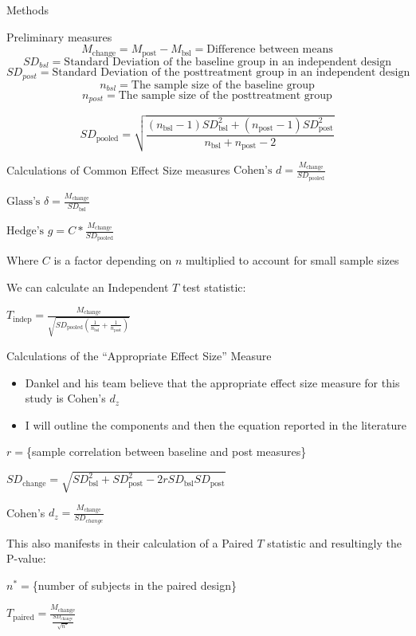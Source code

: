 \documentclass[
  ignorenonframetext,
  aspectratio=169,
]{beamer}
\providecommand{\tightlist}{%
  \setlength{\itemsep}{0pt}\setlength{\parskip}{0pt}}
\begin{document}
\begin{frame}{Methods}
\protect\hypertarget{methods}{}
\begin{block}{Preliminary measures}
\protect\hypertarget{preliminary-measures}{}
\[
M_{\text{change}}=M_{\text{post}}-M_{\text{bsl}}=\text{Difference between means}
\] \[
SD_{bsl}={\text{Standard Deviation of the baseline group in an independent design}}
\] \[
SD_{post}={\text{Standard Deviation of the posttreatment group in an independent design}}
\] \[
n_{bsl}= \text{The sample size of the baseline group}
\] \[
n_{post}= \text{The sample size of the posttreatment group}
\]

\[
SD_\text{pooled}=\sqrt{\frac{(n_{\text{bsl}}-1)SD_{\text{bsl}}^2+(n_{\text{post}}-1)SD^2_{\text{post}}}{
n_{\text{bsl}}+n_{\text{post}}-2}}
\]
\end{block}
\end{frame}

\begin{frame}{Calculations of Common Effect Size measures}
\protect\hypertarget{calculations-of-common-effect-size-measures}{}
\(\text{Cohen's } d= \frac{M_\text{change}}{SD_\text{pooled}}\)

\(\text{Glass's } \delta = \frac{M_\text{change}}{SD_{\text{bsl}}}\)

\(\text{Hedge's }g= C*\frac{M_\text{change}}{SD_\text{pooled}}\)

Where \(C\) is a factor depending on \(n\) multiplied to account for
small sample sizes

We can calculate an Independent \(T\) test statistic:

\(T_\text{indep}= \frac{M_{\text{change}}}{\sqrt{SD_{\text{pooled}}(\frac{1}{n_\text{bsl}}+\frac{1}{n_{\text{post}}})}}\)
\end{frame}

\begin{frame}{Calculations of the ``Appropriate Effect Size'' Measure}
\protect\hypertarget{calculations-of-the-appropriate-effect-size-measure}{}
\begin{itemize}
\tightlist
\item
  Dankel and his team believe that the appropriate effect size measure
  for this study is Cohen's \(d_z\)
\item
  I will outline the components and then the equation reported in the
  literature
\end{itemize}

\(r =\)\{sample correlation between baseline and post measures\}

\(SD_\text{change}=\sqrt{SD_{\text{bsl}}^2+SD_{\text{post}}^2-2rSD_{\text{bsl}}SD_{\text{post}}}\)

Cohen's \(d_{z}= \frac{M_\text{change}}{SD_{change}}\)

This also manifests in their calculation of a Paired \(T\) statistic and
resultingly the P-value:

\(n^*=\)\{number of subjects in the paired design\}

\(T_{\text{paired}}=\frac{M_{\text{change}}}{\frac{SD_{\text{change}}}{\sqrt{n^*}}}\)
\end{frame}
\end{document}
